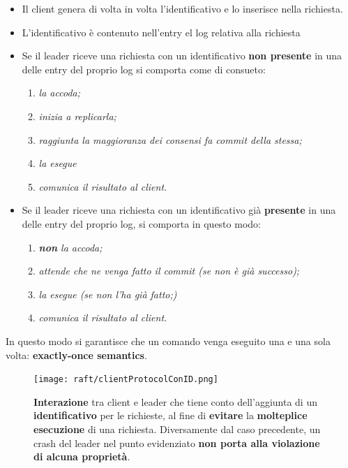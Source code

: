  	\begin{itemize}
 		\item{{Il client genera di volta in volta l'identificativo e lo inserisce nella richiesta.}}
 		\item{{L'identificativo è contenuto nell'entry el log relativa alla richiesta}}
 		\item{{Se il leader riceve una richiesta con un identificativo \textbf{non presente} in una delle entry del proprio log si comporta come di consueto: 
 			\begin{enumerate}
 				\item{\emph{la accoda;}}
 				\item{\emph{inizia a replicarla;}}
 				\item{\emph{raggiunta la maggioranza dei consensi fa commit della stessa;}}
 				\item{\emph{la esegue}}
 				\item{\emph{comunica il risultato al client.}}
 			\end{enumerate}
 		}}
 		\item{Se il leader riceve una richiesta con un identificativo già \textbf{presente} in una delle entry del proprio log, si comporta in questo modo:
			\begin{enumerate}
 				\item{\emph{\textbf{non} la accoda;}}
 				\item{\emph{attende che ne venga fatto il commit (se non è già successo);}}
 				\item{\emph{la esegue (se non l'ha già fatto;)}}
 				\item{\emph{comunica il risultato al client.}}
 				
 			\end{enumerate}
 		}
 		
 	\end{itemize}

In questo modo si garantisce che un comando venga eseguito una e una sola volta: \textbf{exactly-once semantics}.

	  \begin{figure}[H]
	    \centering
	    \texttt{[image: raft/clientProtocolConID.png]}
	    \caption{\textbf{Interazione} tra client e leader che tiene conto dell'aggiunta di un \textbf{identificativo} per le richieste, al fine di \textbf{evitare} la \textbf{molteplice esecuzione} di una richiesta. Diversamente dal caso precedente, un crash del leader nel punto evidenziato \textbf{non porta alla violazione di alcuna proprietà}.}
	    \label{fig:figure 13}
	  \end{figure} 

